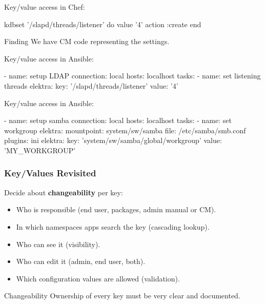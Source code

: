 \begin{frame}[fragile]
	Key/value access in Chef:
	\vspace{0.5cm}

	\begin{code}[morekeywords={kdbset,do,action,value,end},gobble=4]
	kdbset '/slapd/threads/listener' do
		value '4'
		action :create
	end
	\end{code}

	\pause
	\begin{alertblock}{Finding}
	We have CM code representing the settings.
	\end{alertblock}
\end{frame}

\begin{frame}[fragile]
	Key/value access in Ansible:
	\vspace{0.5cm}

	\begin{code}[morekeywords={name,connection,key,value,elektra,mountpoint,file,plugins,hosts,tasks},gobble=4]
	- name: setup LDAP
	  connection: local
	  hosts: localhost
	  tasks:
	  - name: set listening threads
	    elektra:
	      key: '/slapd/threads/listener'
	      value: '4'
	\end{code}
\end{frame}


\begin{frame}[fragile]
	Key/value access in Ansible:

	\begin{code}[morekeywords={name,connection,key,value,elektra,mountpoint,file,plugins,hosts,tasks},gobble=4]
	- name: setup samba
	  connection: local
	  hosts: localhost
	  tasks:
	  - name: set workgroup
	    elektra:
	      mountpoint: system/sw/samba
	      file: /etc/samba/smb.conf
	      plugins: ini
	    elektra:
	      key: 'system/sw/samba/global/workgroup'
	      value: 'MY_WORKGROUP'
	\end{code}
\end{frame}

\begin{frame}
	\frametitle{Key/Values Revisited}

	Decide about \textbf{changeability} per key:

	\begin{itemize}[<+-| alert@+>]
	\item Who is responsible (end user, packages, admin manual or CM).
	\item In which namespaces apps search the key (cascading lookup).
	\item Who can see it (visibility).
	\item Who can edit it (admin, end user, both).
	\item Which configuration values are allowed (validation).
	\end{itemize}

	\pause[\thebeamerpauses]  %

	\begin{alertblock}{Changeability}
	Ownership of every key must be very clear and documented.
	\end{alertblock}
\end{frame}

